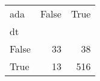 \begin{tabular}{lrr}
\toprule
ada &  False &  True  \\
dt    &        &        \\
\midrule
False &     33 &     38 \\
True  &     13 &    516 \\
\bottomrule
\end{tabular}
